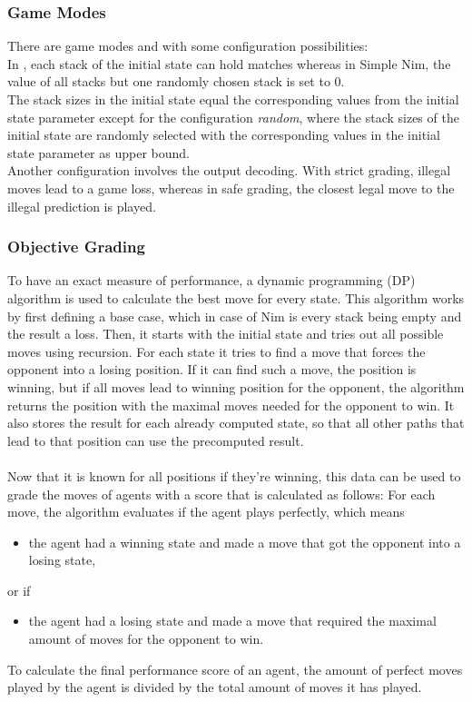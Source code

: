 \documentclass[11pt]{report}
\begin{document}
\begin{enumerate}
    \subsubsection{Game Modes}
    There are game modes  and  with some configuration possibilities:
    \\
    In , each stack of the initial state can hold matches whereas in Simple Nim, the value of all stacks but one randomly chosen stack is set to 0.
    \\
    The stack sizes in the initial state equal the corresponding values from the initial state parameter except for the configuration \textit{random}, where the stack sizes of the initial state are randomly selected with the corresponding values in the initial state parameter as upper bound.
    \\
    Another configuration involves the output decoding.
    With strict grading, illegal moves lead to a game loss, whereas in safe grading, the closest legal move to the illegal prediction is played.

    \subsubsection{Objective Grading}
    To have an exact measure of performance, a dynamic programming (DP) algorithm is used to calculate the best move for every state.
    This algorithm works by first defining a base case, which in case of Nim is every stack being empty and the result a loss.
    Then, it starts with the initial state and tries out all possible moves using recursion.
    For each state it tries to find a move that forces the opponent into a losing position.
    If it can find such a move, the position is winning, but if all moves lead to winning position for the opponent, the algorithm returns the position with the maximal moves needed for the opponent to win.
    It also stores the result for each already computed state, so that all other paths that lead to that position can use the precomputed result.
    \\ \\
    Now that it is known for all positions if they're winning, this data can be used to grade the moves of agents with a score that is calculated as follows:
    For each move, the algorithm evaluates if the agent plays perfectly, which means
    \begin{itemize}
        \item the agent had a winning state and made a move that got the opponent into a losing state,
    \end{itemize}
    or if
    \begin{itemize}
        \item the agent had a losing state and made a move that required the maximal amount of moves for the opponent to win.
    \end{itemize}
    To calculate the final performance score of an agent, the amount of perfect moves played by the agent is divided by the total amount of moves it has played.



\end{enumerate}
\end{document}
